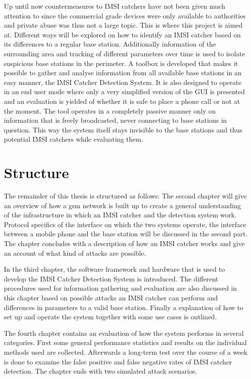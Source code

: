 Up until now countermeasures to IMSI catchers have not been given much attention to since the commercial grade devices were only available to authorities and private abuse was thus not a large topic.
This is where this project is aimed at.
Different ways will be explored on how to identify an IMSI catcher based on its differences to a regular base station.
Additionally information of the surrounding area and tracking of different parameters over time is used to isolate suspicious base stations in the perimeter.
A toolbox is developed that makes it possible to gather and analyse information from all available base stations in an easy manner, the IMSI Catcher Detection System.
It is also designed to operate in an end user mode where only a very simplified version of the GUI is presented and an evaluation is yielded of whether it is safe to place a phone call or not at the moment.
The tool operates in a completely passive manner only on information that is freely broadcasted, never connecting to base stations in question.
This way the system itself stays invisible to the base stations and thus potential IMSI catchers while evaluating them.

\section{Structure}
The remainder of this thesis is structured as follows:
The second chapter will give an overview of how a \gls{gsm} network is built up to create a general understanding of the infrastructure in which an IMSI catcher and the detection system work.
Protocol specifics of the interface on which the two systems operate, the interface between a mobile phone and the base station will be discussed in the second part.
The chapter concludes with a description of how an IMSI catcher works and give an account of what kind of attacks are possible.

In the third chapter, the software framework and hardware that is used to develop the IMSI Catcher Detection System is introduced.
The different procedures used for information gathering and evaluation are also discussed in this chapter based on possible attacks an IMSI catcher can perform and differences in parameters to a valid base station.
Finally a explanation of how to set up and operate the system together with some use cases is outlined.

The fourth chapter contains an evaluation of how the system performs in several categories.
First some general performance statistics and results on the individual methods used are collected.
Afterwards a long-term test over the course of a week is done to examine the false positive and false negative rates of IMSI catcher detection.
The chapter ends with two simulated attack scenarios.


